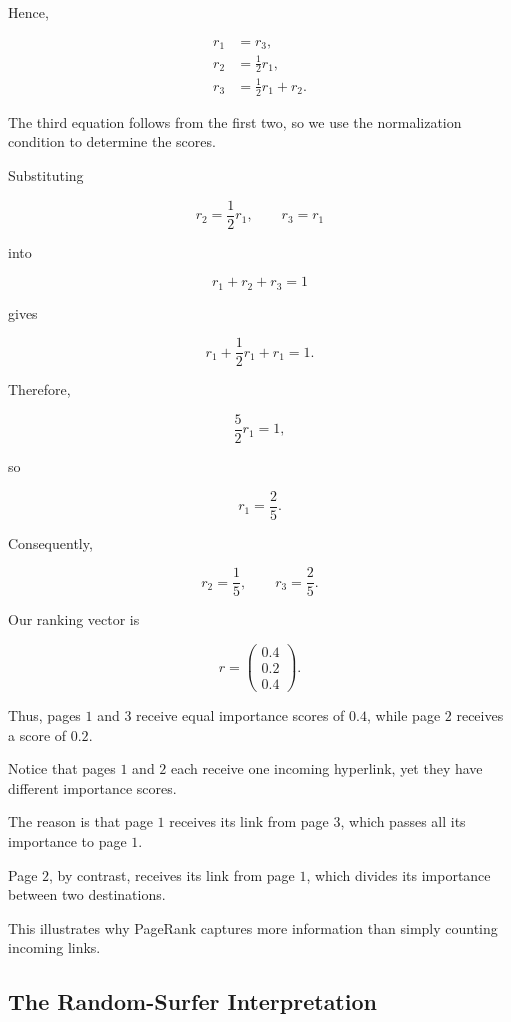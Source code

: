 \documentclass[11pt,a4paper]{article}
\theoremstyle{definition}
\theoremstyle{remark}
\begin{document}
Hence,

\begin{align*}
r_1&=r_3,\\
r_2&=\frac12r_1,\\
r_3&=\frac12r_1+r_2.
\end{align*}

The third equation follows
from the first two,
so we use the normalization
condition to determine
the scores.

Substituting

\[
r_2=\frac12r_1,
\qquad
r_3=r_1
\]

into

\[
r_1+r_2+r_3=1
\]

gives

\[
r_1+\frac12r_1+r_1=1.
\]

Therefore,

\[
\frac52r_1=1,
\]

so

\[
r_1=\frac25.
\]

Consequently,

\[
r_2=\frac15,
\qquad
r_3=\frac25.
\]

Our ranking vector is

\begin{equation}
\boxed{
r=
\begin{pmatrix}
0.4\\
0.2\\
0.4
\end{pmatrix}.
}
\label{eq:pagerank_three_page_result}
\end{equation}

Thus, pages $1$ and $3$
receive equal importance
scores of $0.4$,
while page $2$ receives
a score of $0.2$.

Notice that pages $1$
and $2$ each receive
one incoming hyperlink,
yet they have different
importance scores.

The reason is that
page $1$ receives its
link from page $3$,
which passes all its
importance to page $1$.

Page $2$, by contrast,
receives its link from
page $1$, which divides
its importance between
two destinations.

This illustrates why
PageRank captures more
information than simply
counting incoming links.


\subsection{The Random-Surfer Interpretation}
\end{document}
